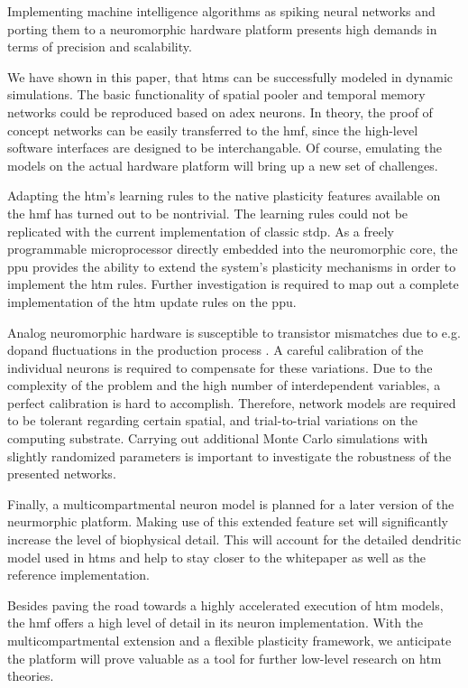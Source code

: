 Implementing machine intelligence algorithms as spiking neural networks and porting them to a neuromorphic hardware platform presents high demands in terms of precision and scalability.

We have shown in this paper, that \glspl{htm} can be successfully modeled in dynamic simulations. The basic functionality of spatial pooler and temporal memory networks could be reproduced based on \gls{adex} neurons. In theory, the proof of concept networks can be easily transferred to the \gls{hmf}, since the high-level software interfaces are designed to be interchangable. Of course, emulating the models on the actual hardware platform will bring up a new set of challenges.

Adapting the \gls{htm}'s learning rules to the native plasticity features
available on the \gls{hmf} has turned out to be nontrivial. The learning rules
could not be replicated with the current implementation of classic \gls{stdp}.
As a freely programmable microprocessor directly embedded into the neuromorphic
core, the \gls{ppu} provides the ability to extend the system's plasticity
mechanisms in order to implement the \gls{htm} rules. Further investigation is
required to map out a complete implementation of the \gls{htm} update rules on
the \gls{ppu}.

Analog neuromorphic hardware is susceptible to transistor mismatches due to e.g. dopand fluctuations in the production process \citep{petrovici2014characterization}. A careful calibration of the individual neurons is required to compensate for these variations. Due to the complexity of the problem and the high number of interdependent variables, a perfect calibration is hard to accomplish. Therefore, network models are required to be tolerant regarding certain spatial, and trial-to-trial variations on the computing substrate. Carrying out additional Monte Carlo simulations with slightly randomized parameters is important to investigate the robustness of the presented networks.

Finally, a multicompartmental neuron model is planned for a later version of the neurmorphic platform. Making use of this extended feature set will significantly increase the level of biophysical detail. This will account for the detailed dendritic model used in \glspl{htm} and help to stay closer to the whitepaper as well as the reference implementation.

Besides paving the road towards a highly accelerated execution of \gls{htm}
models, the \gls{hmf} offers a high level of detail in its neuron
implementation. With the multicompartmental extension and a flexible plasticity
framework, we anticipate the platform will prove valuable as a tool for
further low-level research on \gls{htm} theories.
